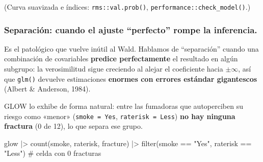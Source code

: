 \documentclass[
  letterpaper,
  DIV=11,
  numbers=noendperiod]{scrartcl}
\newenvironment{Shaded}{\begin{snugshade}}{\end{snugshade}}
\newcommand{\AttributeTok}[1]{\textcolor[rgb]{0.40,0.45,0.13}{#1}}
\newcommand{\CommentTok}[1]{\textcolor[rgb]{0.37,0.37,0.37}{#1}}
\newcommand{\DecValTok}[1]{\textcolor[rgb]{0.68,0.00,0.00}{#1}}
\newcommand{\FunctionTok}[1]{\textcolor[rgb]{0.28,0.35,0.67}{#1}}
\newcommand{\NormalTok}[1]{\textcolor[rgb]{0.00,0.23,0.31}{#1}}
\newcommand{\SpecialCharTok}[1]{\textcolor[rgb]{0.37,0.37,0.37}{#1}}
\newcommand{\StringTok}[1]{\textcolor[rgb]{0.13,0.47,0.30}{#1}}
\begin{document}
\begin{tcolorbox}
\begin{Shaded}
\end{Shaded}

(Curva suavizada e índices: \texttt{rms::val.prob()},
\texttt{performance::check\_model()}.)

\end{tcolorbox}

\hypertarget{separaciuxf3n-cuando-el-ajuste-perfecto-rompe-la-inferencia.}{%
\subsubsection{Separación: cuando el ajuste ``perfecto'' rompe la
inferencia.}\label{separaciuxf3n-cuando-el-ajuste-perfecto-rompe-la-inferencia.}}

Es el patológico que vuelve inútil al Wald. Hablamos de ``separación''
cuando una combinación de covariables \textbf{predice perfectamente} el
resultado en algún subgrupo: la verosimilitud sigue creciendo al alejar
el coeficiente hacia \(\pm\infty\), así que \texttt{glm()} devuelve
estimaciones \textbf{enormes con errores estándar gigantescos} (Albert
\& Anderson, 1984).

GLOW lo exhibe de forma natural: entre las fumadoras que autoperciben su
riesgo como «menor» (\texttt{smoke\ =\ Yes}, \texttt{raterisk\ =\ Less})
\textbf{no hay ninguna fractura} (0 de 12), lo que separa ese grupo.

\begin{Shaded}
\begin{Highlighting}[]
\NormalTok{glow }\SpecialCharTok{|\textgreater{}} \FunctionTok{count}\NormalTok{(smoke, raterisk, fracture) }\SpecialCharTok{|\textgreater{}}
  \FunctionTok{filter}\NormalTok{(smoke }\SpecialCharTok{==} \StringTok{"Yes"}\NormalTok{, raterisk }\SpecialCharTok{==} \StringTok{"Less"}\NormalTok{)        }\CommentTok{\# celda con 0 fracturas}
\end{Highlighting}
\end{Shaded}
\end{document}
